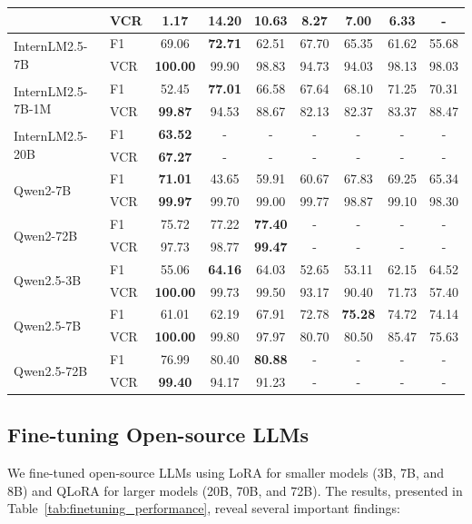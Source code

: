 \begin{table}[htbp]
{\begin{tabular}{l|l|ccccccc}
                            & VCR & 1.17 & \textbf{14.20} & 10.63 & 8.27 & 7.00 & 6.33 & - \\
\hline
\multirow{2}{*}{InternLM2.5-7B} & F1 & 69.06 & \textbf{72.71} & 62.51 & 67.70 & 65.35 & 61.62 & 55.68 \\
                                & VCR & \textbf{100.00} & 99.90 & 98.83 & 94.73 & 94.03 & 98.13 & 98.03 \\
\hline
\multirow{2}{*}{InternLM2.5-7B-1M} & F1 & 52.45 & \textbf{77.01} & 66.58 & 67.64 & 68.10 & 71.25 & 70.31 \\
                                   & VCR & \textbf{99.87} & 94.53 & 88.67 & 82.13 & 82.37 & 83.37 & 88.47 \\
\hline
\multirow{2}{*}{InternLM2.5-20B} & F1 & \textbf{63.52} & - & - & - & - & - & - \\
                                 & VCR & \textbf{67.27} & - & - & - & - & - & - \\
\hline
\multirow{2}{*}{Qwen2-7B} & F1 & \textbf{71.01} & 43.65 & 59.91 & 60.67 & 67.83 & 69.25 & 65.34 \\
                              & VCR & \textbf{99.97} & 99.70 & 99.00 & 99.77 & 98.87 & 99.10 & 98.30 \\
\hline
\multirow{2}{*}{Qwen2-72B} & F1 & 75.72 & 77.22 & \textbf{77.40} & - & - & - & - \\
                               & VCR & 97.73 & 98.77 & \textbf{99.47} & - & - & - & - \\
\hline
\multirow{2}{*}{Qwen2.5-3B} & F1 & 55.06 & \textbf{64.16} & 64.03 & 52.65 & 53.11 & 62.15 & 64.52 \\
                            & VCR & \textbf{100.00} & 99.73 & 99.50 & 93.17 & 90.40 & 71.73 & 57.40 \\
\hline
\multirow{2}{*}{Qwen2.5-7B} & F1 & 61.01 & 62.19 & 67.91 & 72.78 & \textbf{75.28} & 74.72 & 74.14 \\
                            & VCR & \textbf{100.00} & 99.80 & 97.97 & 80.70 & 80.50 & 85.47 & 75.63 \\
\hline
\multirow{2}{*}{Qwen2.5-72B} & F1 & 76.99 & 80.40 & \textbf{80.88} & - & - & - & - \\
                             & VCR & \textbf{99.40} & 94.17 & 91.23 & - & - & - & - \\
\hline
\end{tabular}
}
\label{tab:performance}
\end{table}

\subsection{Fine-tuning Open-source LLMs}
We fine-tuned open-source LLMs using LoRA for smaller models (3B, 7B, and 8B) and QLoRA for larger models (20B, 70B, and 72B). The results, presented in Table~\ref{tab:finetuning_performance}, reveal several important findings:


